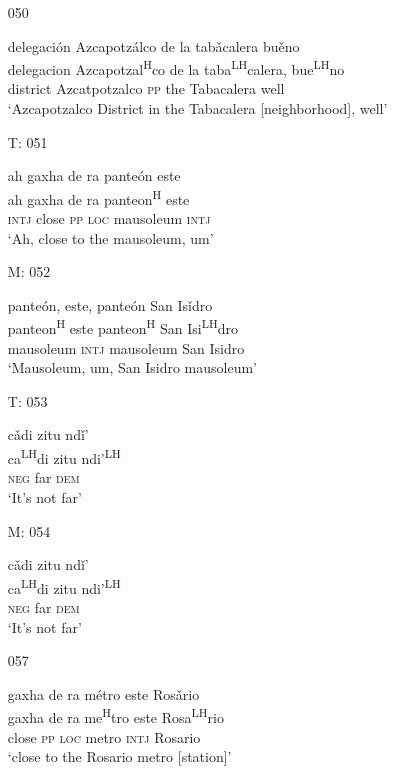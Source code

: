 \begin{itemize}
\item[050]
 
\glll   delegaci\'{o}n Azcapotz\'{a}lco de la tab\v{a}calera bu\v{e}no\\
delegacion Azcapotzal\textsuperscript{H}co de la taba\textsuperscript{LH}calera, bue\textsuperscript{LH}no\\
district Azcatpotzalco \textsc{pp} the Tabacalera well\\
\glt `Azcapotzalco District in the Tabacalera [neighborhood], well'
 



\item[T: 051]
 
\glll   ah gaxha de ra pante\'{o}n este \\
ah gaxha de ra panteon\textsuperscript{H} este\\
\textsc{intj} close \textsc{pp} \textsc{loc} mausoleum \textsc{intj}\\
\glt `Ah, close to the mausoleum, um'
 

\item[M: 052]
 
\glll   pante\'{o}n, este, pante\'{o}n San Is\v{i}dro\\
panteon\textsuperscript{H} este panteon\textsuperscript{H} San Isi\textsuperscript{LH}dro\\
mausoleum \textsc{intj} mausoleum San Isidro\\
\glt `Mausoleum, um, San Isidro mausoleum'
 


\item[T: 053]
 
\glll   c\v{a}di zitu nd\v{i}'\\
ca\textsuperscript{LH}di zitu ndi'\textsuperscript{LH}\\
\textsc{neg} far \textsc{dem}\\
\glt `It's not far'
 


\item[M: 054]
 
\glll   c\v{a}di zitu nd\v{i}'\\
ca\textsuperscript{LH}di zitu ndi'\textsuperscript{LH}\\
\textsc{neg} far \textsc{dem}\\
\glt `It's not far'
 


\item[057]
 
\glll   gaxha de ra m\'{e}tro este Ros\v{a}rio\\
gaxha de ra me\textsuperscript{H}tro este Rosa\textsuperscript{LH}rio\\
close \textsc{pp} \textsc{loc} metro \textsc{intj} Rosario\\
\glt `close to the Rosario metro [station]' 
 


\end{itemize}
